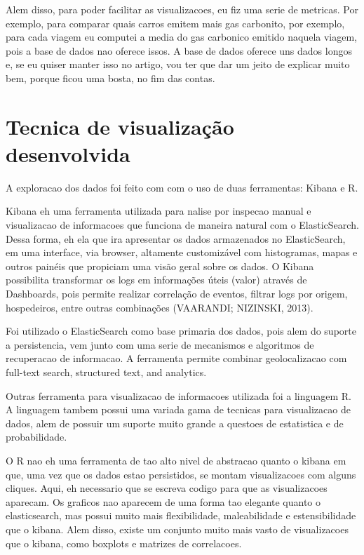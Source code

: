 \documentclass[10pt, conference]{IEEEtran}
\begin{document}
Alem disso, para poder facilitar as visualizacoes, eu fiz uma serie de metricas. Por exemplo, 
para comparar quais carros emitem mais gas carbonito, por exemplo, para cada viagem eu computei
a media do gas carbonico emitido naquela viagem, pois a base de dados nao oferece issos. A base de
dados oferece uns dados longos e, se eu quiser manter isso no artigo, vou ter que dar
um jeito de explicar muito bem, porque ficou uma bosta, no fim das contas.



\section{Tecnica de visualização desenvolvida}
\label{sec:technique}
%
A exploracao dos dados foi feito com com o uso de duas ferramentas: Kibana e R.


Kibana eh uma ferramenta utilizada para nalise por inspecao manual e visualizacao
de informacoes que funciona de maneira natural com o ElasticSearch. Dessa  forma, 
eh  ela  que ira apresentar os dados armazenados no ElasticSearch, em uma interface,  via
browser, altamente customizável com histogramas, mapas e outros painéis que propiciam uma visão
geral sobre os dados.  O Kibana possibilita transformar os logs em informações úteis (valor)
através  de Dashboards,  pois  permite  realizar  correlação  de  eventos,  filtrar logs
por  origem, hospedeiros, entre outras combinações (VAARANDI; NIZINSKI, 2013).

Foi utilizado o ElasticSearch como base primaria dos dados, pois alem do suporte a persistencia,
vem junto com uma serie de mecanismos e algoritmos de recuperacao de informacao. A ferramenta
permite combinar geolocalizacao com full-text search, structured text, and analytics.

Outras ferramenta para visualizacao de informacoes utilizada foi a linguagem R. A linguagem
tambem possui uma variada gama de tecnicas para visualizacao de dados, alem de possuir um
suporte muito grande a questoes de estatistica e de probabilidade. 

O R nao eh uma ferramenta de tao alto nivel de abstracao quanto o kibana em que, uma vez
que os dados estao persistidos, se montam visualizacoes com alguns cliques. Aqui, eh necessario
que se escreva codigo para que as visualizacoes aparecam. Os graficos nao aparecem de uma
forma tao elegante quanto o elasticsearch, mas possui muito mais flexibilidade, maleabilidade
e estensibilidade que o kibana. Alem disso, existe um conjunto muito mais vasto de visualizacoes
que o kibana, como boxplots e matrizes de correlacoes.
\end{document}
